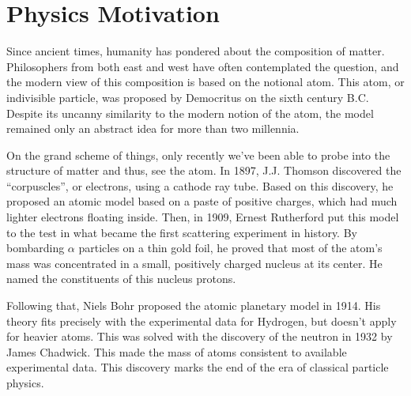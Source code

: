 \section{Physics Motivation} \label{sec::physicsmotivation}
    Since ancient times, humanity has pondered about the composition of matter.
    Philosophers from both east and west have often contemplated the question, and the modern view of this composition is based on the notional atom.
    This atom, or indivisible particle, was proposed by Democritus on the sixth century B.C.
    Despite its uncanny similarity to the modern notion of the atom, the model remained only an abstract idea for more than two millennia.

    On the grand scheme of things, only recently we've been able to probe into the structure of matter and thus, see the atom.
    In 1897, J.J. Thomson discovered the ``corpuscles'', or electrons, using a cathode ray tube.
    Based on this discovery, he proposed an atomic model based on a paste of positive charges, which had much lighter electrons floating inside.
    Then, in 1909, Ernest Rutherford put this model to the test in what became the first scattering experiment in history.
    By bombarding $\alpha$ particles on a thin gold foil, he proved that most of the atom's mass was concentrated in a small, positively charged nucleus at its center.
    He named the constituents of this nucleus protons.

    Following that, Niels Bohr proposed the atomic planetary model in 1914.
    His theory fits precisely with the experimental data for Hydrogen, but doesn't apply for heavier atoms.
    This was solved with the discovery of the neutron in 1932 by James Chadwick.
    This made the mass of atoms consistent to available experimental data.
    This discovery marks the end of the era of classical particle physics.


